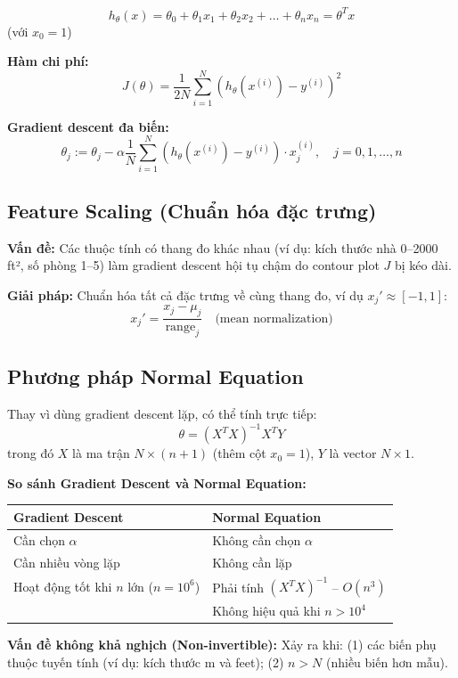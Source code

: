\documentclass[10pt]{article}
\begin{document}
\[
h_\theta(x) = \theta_0 + \theta_1 x_1 + \theta_2 x_2 + \ldots + \theta_n x_n = \theta^T x
\]
(với $x_0 = 1$)

\textbf{Hàm chi phí:}
\[
J(\theta) = \frac{1}{2N}\sum_{i=1}^{N}(h_\theta(x^{(i)}) - y^{(i)})^2
\]

\textbf{Gradient descent đa biến:}
\[
\theta_j := \theta_j - \alpha \frac{1}{N}\sum_{i=1}^{N}(h_\theta(x^{(i)}) - y^{(i)}) \cdot x_j^{(i)}, \quad j = 0, 1, \ldots, n
\]

\subsection{Feature Scaling (Chuẩn hóa đặc trưng)}

\textbf{Vấn đề:} Các thuộc tính có thang đo khác nhau (ví dụ: kích thước nhà 0--2000 ft², số phòng 1--5) làm gradient descent hội tụ chậm do contour plot $J$ bị kéo dài.

\textbf{Giải pháp:} Chuẩn hóa tất cả đặc trưng về cùng thang đo, ví dụ $x_j' \approx [-1, 1]$:
\[
x_j' = \frac{x_j - \mu_j}{\text{range}_j} \quad \text{(mean normalization)}
\]

\subsection{Phương pháp Normal Equation}

Thay vì dùng gradient descent lặp, có thể tính trực tiếp:
\[
\theta = (X^T X)^{-1} X^T Y
\]
trong đó $X$ là ma trận $N \times (n+1)$ (thêm cột $x_0 = 1$), $Y$ là vector $N \times 1$.

\textbf{So sánh Gradient Descent và Normal Equation:}

\begin{singlespace}
\begin{longtable}{|p{}|p{}|}
\hline
\textbf{Gradient Descent} & \textbf{Normal Equation} \\
\hline
\endhead
Cần chọn $\alpha$ & Không cần chọn $\alpha$ \\
\hline
Cần nhiều vòng lặp & Không cần lặp \\
\hline
Hoạt động tốt khi $n$ lớn ($n = 10^6$) & Phải tính $(X^TX)^{-1}$ -- $O(n^3)$ \\
\hline
& Không hiệu quả khi $n > 10^4$ \\
\hline
\end{longtable}
\end{singlespace}

\textbf{Vấn đề không khả nghịch (Non-invertible):} Xảy ra khi: (1) các biến phụ thuộc tuyến tính (ví dụ: kích thước m và feet); (2) $n > N$ (nhiều biến hơn mẫu).
\end{document}
